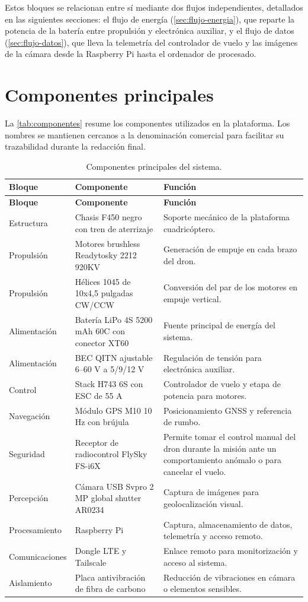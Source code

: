 Estos bloques se relacionan entre sí mediante dos flujos independientes, detallados en las siguientes secciones: el flujo de energía (\autoref{sec:flujo-energia}), que reparte la potencia de la batería entre propulsión y electrónica auxiliar, y el flujo de datos (\autoref{sec:flujo-datos}), que lleva la telemetría del controlador de vuelo y las imágenes de la cámara desde la Raspberry Pi hasta el ordenador de procesado.

\section{Componentes principales}
\label{sec:componentes-principales}

La \autoref{tab:componentes} resume los componentes utilizados en la plataforma. Los nombres se mantienen cercanos a la denominación comercial para facilitar su trazabilidad durante la redacción final.

\begin{longtable}{p{}p{}p{}}
\caption{Componentes principales del sistema.}\label{tab:componentes}\\
\toprule
\textbf{Bloque} & \textbf{Componente} & \textbf{Función} \\
\midrule
\endfirsthead
\toprule
\textbf{Bloque} & \textbf{Componente} & \textbf{Función} \\
\midrule
\endhead
Estructura & Chasis F450 negro con tren de aterrizaje & Soporte mecánico de la plataforma cuadricóptero. \\
Propulsión & Motores brushless Readytosky 2212 920KV & Generación de empuje en cada brazo del dron. \\
Propulsión & Hélices 1045 de 10x4,5 pulgadas CW/CCW & Conversión del par de los motores en empuje vertical. \\
Alimentación & Batería LiPo 4S 5200 mAh 60C con conector XT60 & Fuente principal de energía del sistema. \\
Alimentación & BEC QITN ajustable 6--60 V a 5/9/12 V & Regulación de tensión para electrónica auxiliar. \\
Control & Stack H743 6S con ESC de 55 A & Controlador de vuelo y etapa de potencia para motores. \\
Navegación & Módulo GPS M10 10 Hz con brújula & Posicionamiento GNSS y referencia de rumbo. \\
Seguridad & Receptor de radiocontrol FlySky FS-i6X & Permite tomar el control manual del dron durante la misión ante un comportamiento anómalo o para cancelar el vuelo. \\
Percepción & Cámara USB Svpro 2 MP global shutter AR0234 & Captura de imágenes para geolocalización visual. \\
Procesamiento & Raspberry Pi & Captura, almacenamiento de datos, telemetría y acceso remoto. \\
Comunicaciones & Dongle LTE y Tailscale & Enlace remoto para monitorización y acceso al sistema. \\
Aislamiento & Placa antivibración de fibra de carbono & Reducción de vibraciones en cámara o elementos sensibles. \\
\bottomrule
\end{longtable}

